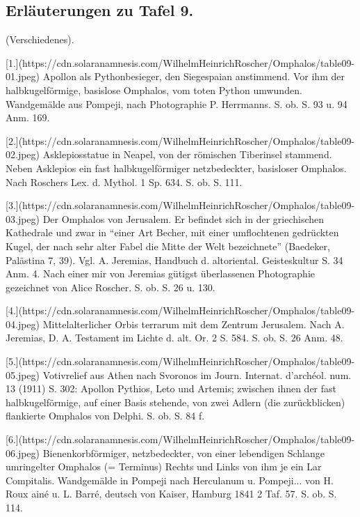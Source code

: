 \documentclass[a4paper, 11pt, oneside]{article}
\begin{document}
\subsection{Erläuterungen zu Tafel 9.}

(Verschiedenes).

[1.](https://cdn.solaranamnesis.com/WilhelmHeinrichRoscher/Omphalos/table09-01.jpeg) Apollon als Pythonbesieger, den Siegespaian anstimmend. Vor ihm der halbkugelförmige, basislose Omphalos, vom toten Python umwunden. Wandgemälde aus Pompeji, nach Photographie P. Herrmanns. S. ob. S. 93 u. 94 Anm. 169.

[2.](https://cdn.solaranamnesis.com/WilhelmHeinrichRoscher/Omphalos/table09-02.jpeg) Asklepiosstatue in Neapel, von der römischen Tiberinsel stammend. Neben Asklepios ein fast halbkugelförmiger netzbedeckter, basisloser Omphalos. Nach Roschers Lex. d. Mythol. 1 Sp. 634. S. ob. S. 111.

[3.](https://cdn.solaranamnesis.com/WilhelmHeinrichRoscher/Omphalos/table09-03.jpeg) Der Omphalos von Jerusalem. Er befindet sich in der griechischen Kathedrale und zwar in "`einer Art Becher, mit einer umflochtenen gedrückten Kugel, der nach sehr alter Fabel die Mitte der Welt bezeichnete"' (Baedeker, Palästina 7, 39). Vgl. A. Jeremias, Handbuch d. altoriental. Geisteskultur S. 34 Anm. 4. Nach einer mir von Jeremias gütigst überlassenen Photographie gezeichnet von Alice Roscher. S. ob. S. 26 u. 130.

[4.](https://cdn.solaranamnesis.com/WilhelmHeinrichRoscher/Omphalos/table09-04.jpeg) Mittelalterlicher Orbis terrarum mit dem Zentrum Jerusalem. Nach A. Jeremias, D. A. Testament im Lichte d. alt. Or. 2 S. 584. S. ob. S. 26 Anm. 48.

[5.](https://cdn.solaranamnesis.com/WilhelmHeinrichRoscher/Omphalos/table09-05.jpeg) Votivrelief aus Athen nach Svoronos im Journ. Internat. d'archéol. num. 13 (1911) S. 302: Apollon Pythios, Leto und Artemis; zwischen ihnen der fast halbkugelförmige, auf einer Basis stehende, von zwei Adlern (die zurückblicken) flankierte Omphalos von Delphi. S. ob. S. 84 f.

[6.](https://cdn.solaranamnesis.com/WilhelmHeinrichRoscher/Omphalos/table09-06.jpeg) Bienenkorbförmiger, netzbedeckter, von einer lebendigen Schlange umringelter Omphalos (= Terminus) Rechts und Links von ihm je ein Lar Compitalis. Wandgemälde in Pompeji nach Herculanum u. Pompeji... von H. Roux ainé u. L. Barré, deutsch von Kaiser, Hamburg 1841 2 Taf. 57. S. ob. S. 114.
\end{document}
